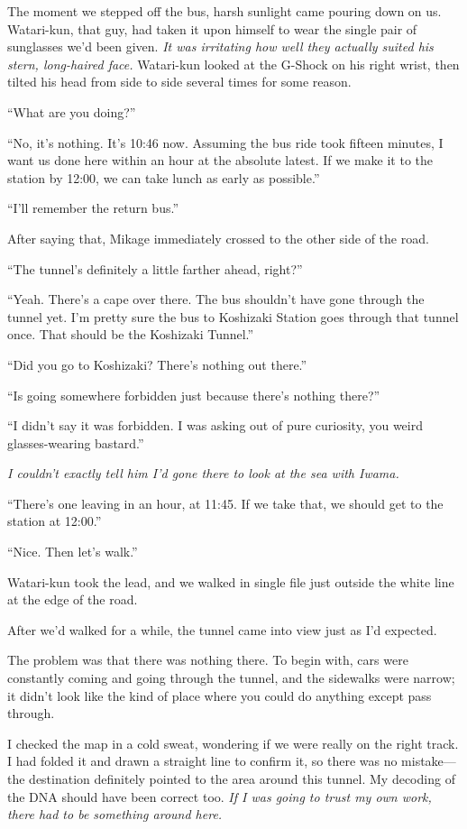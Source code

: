 \documentclass[
    a4paper,
    12pt,
    twoside,
    openany,
    UTF8,
    fontset=windows
]{ctexbook}
\begin{document}
The moment we stepped off the bus, harsh sunlight came pouring down on us. Watari-kun, that guy, had taken it upon himself to wear the single pair of sunglasses we'd been given. \textit{It was irritating how well they actually suited his stern, long-haired face.} Watari-kun looked at the G-Shock on his right wrist, then tilted his head from side to side several times for some reason.

``What are you doing?''

``No, it's nothing. It's 10:46 now. Assuming the bus ride took fifteen minutes, I want us done here within an hour at the absolute latest. If we make it to the station by 12:00, we can take lunch as early as possible.''

``I'll remember the return bus.''

After saying that, Mikage immediately crossed to the other side of the road.

``The tunnel's definitely a little farther ahead, right?''

``Yeah. There's a cape over there. The bus shouldn't have gone through the tunnel yet. I'm pretty sure the bus to Koshizaki Station goes through that tunnel once. That should be the Koshizaki Tunnel.''

``Did you go to Koshizaki? There's nothing out there.''

``Is going somewhere forbidden just because there's nothing there?''

``I didn't say it was forbidden. I was asking out of pure curiosity, you weird glasses-wearing bastard.''

\textit{I couldn't exactly tell him I'd gone there to look at the sea with Iwama.}

``There's one leaving in an hour, at 11:45. If we take that, we should get to the station at 12:00.''

``Nice. Then let's walk.''

Watari-kun took the lead, and we walked in single file just outside the white line at the edge of the road.

After we'd walked for a while, the tunnel came into view just as I'd expected.

The problem was that there was nothing there. To begin with, cars were constantly coming and going through the tunnel, and the sidewalks were narrow; it didn't look like the kind of place where you could do anything except pass through.

I checked the map in a cold sweat, wondering if we were really on the right track. I had folded it and drawn a straight line to confirm it, so there was no mistake---the destination definitely pointed to the area around this tunnel. My decoding of the DNA should have been correct too. \textit{If I was going to trust my own work, there had to be something around here.}
\end{document}
